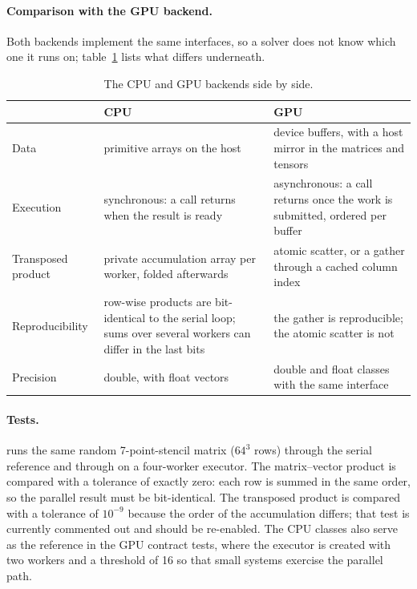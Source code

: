 \documentclass[main.tex]{subfiles}
\begin{document}
    \paragraph{Comparison with the GPU backend.}
    Both backends implement the same interfaces, so a solver does not know which one it runs on; table~\ref{tab:cpu-vs-gpu} lists what differs underneath.
    \begin{table}[ht]
        \centering
        \small
        \renewcommand{\arraystretch}{1.25}
        \begin{tabularx}{\textwidth}{@{}>{\raggedright\arraybackslash}p{2.7cm}>{\raggedright\arraybackslash}X>{\raggedright\arraybackslash}X@{}}
            \toprule
            & CPU & GPU \\
            \midrule
            Data & primitive arrays on the host & device buffers, with a host mirror in the matrices and tensors \\
            Execution & synchronous: a call returns when the result is ready & asynchronous: a call returns once the work is submitted, ordered per buffer \\
            Transposed product & private accumulation array per worker, folded afterwards & atomic scatter, or a gather through a cached column index \\
            Reproducibility & row-wise products are bit-identical to the serial loop; sums over several workers can differ in the last bits & the gather is reproducible; the atomic scatter is not \\
            Precision & double, with float vectors & double and float classes with the same interface \\
            \bottomrule
        \end{tabularx}
        \caption{The CPU and GPU backends side by side.}
        \label{tab:cpu-vs-gpu}
    \end{table}

    \paragraph{Tests.}
     runs the same random 7-point-stencil matrix ($64^3$ rows) through the serial reference  and through  on a four-worker executor. The matrix--vector product is compared with a tolerance of exactly zero: each row is summed in the same order, so the parallel result must be bit-identical. The transposed product is compared with a tolerance of $10^{-9}$ because the order of the accumulation differs; that test is currently commented out and should be re-enabled. The CPU classes also serve as the reference in the GPU contract tests, where the executor is created with two workers and a threshold of 16 so that small systems exercise the parallel path.
\end{document}
